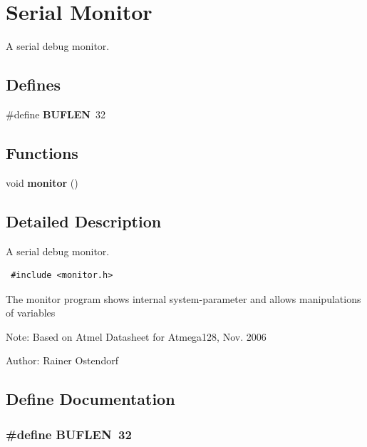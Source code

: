 \section{Serial Monitor}
\label{group__ro__monitor}
A serial debug monitor.  
\subsection*{Defines}
\begin{CompactItemize}
\item 
\#define {\bf BUFLEN}~32
\end{CompactItemize}
\subsection*{Functions}
\begin{CompactItemize}
\item 
void {\bf monitor} ()
\end{CompactItemize}


\subsection{Detailed Description}
A serial debug monitor. 



\begin{Code}\begin{verbatim} #include <monitor.h> 
\end{verbatim}\end{Code}



The monitor program shows internal system-parameter and allows manipulations of variables

\begin{Desc}
\item[Note:]Based on Atmel Datasheet for Atmega128, Nov. 2006 \end{Desc}
\begin{Desc}
\item[Author:]Rainer Ostendorf \end{Desc}


\subsection{Define Documentation}
\subsubsection{\setlength{\rightskip}{0pt plus 5cm}\#define BUFLEN~32}\label{group__ro__monitor_gd974fe981249f5e84fbf1683b012c9f8}




